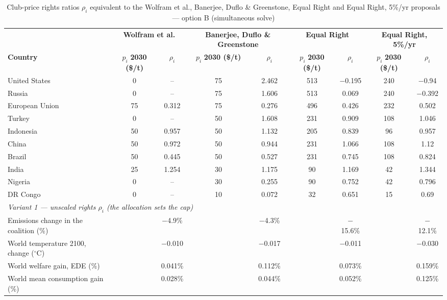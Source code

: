 \begin{table}[htbp]
\centering
\small
\caption{Club-price rights ratios $\rho_i$ equivalent to the Wolfram et al., Banerjee, Duflo \& Greenstone, Equal Right and Equal Right, 5\%/yr proposals --- option B (simultaneous solve)}
\renewcommand{\arraystretch}{1.15}
\begin{tabular}{lcccccccc}
  \toprule
  & \multicolumn{2}{c}{\textbf{Wolfram et al.}} & \multicolumn{2}{c}{\textbf{Banerjee, Duflo \& Greenstone}} & \multicolumn{2}{c}{\textbf{Equal Right}} & \multicolumn{2}{c}{\textbf{Equal Right, 5\%/yr}} \\
  \cmidrule(lr){2-3} \cmidrule(lr){4-5} \cmidrule(lr){6-7} \cmidrule(lr){8-9}
  \textbf{Country} & $p_i$ \textbf{2030 (\$/t)} & $\rho_i$ & $p_i$ \textbf{2030 (\$/t)} & $\rho_i$ & $p_i$ \textbf{2030 (\$/t)} & $\rho_i$ & $p_i$ \textbf{2030 (\$/t)} & $\rho_i$ \\
  \midrule
  United States & 0 & -- & 75 & 2.462 & 513 & $-$0.195 & 240 & $-$0.94 \\
  Russia & 0 & -- & 75 & 1.606 & 513 & 0.069 & 240 & $-$0.392 \\
  European Union & 75 & 0.312 & 75 & 0.276 & 496 & 0.426 & 232 & 0.502 \\
  Turkey & 0 & -- & 50 & 1.608 & 231 & 0.909 & 108 & 1.046 \\
  Indonesia & 50 & 0.957 & 50 & 1.132 & 205 & 0.839 & 96 & 0.957 \\
  China & 50 & 0.972 & 50 & 0.944 & 231 & 1.066 & 108 & 1.12 \\
  Brazil & 50 & 0.445 & 50 & 0.527 & 231 & 0.745 & 108 & 0.824 \\
  India & 25 & 1.254 & 30 & 1.175 & 90 & 1.169 & 42 & 1.344 \\
  Nigeria & 0 & -- & 30 & 0.255 & 90 & 0.752 & 42 & 0.796 \\
  DR Congo & 0 & -- & 10 & 0.072 & 32 & 0.651 & 15 & 0.69 \\
  \midrule
  \multicolumn{9}{l}{\textit{Variant 1 --- unscaled rights $\rho_i$ (the allocation sets the cap)}} \\
  \quad Emissions change in the coalition (\%) &  & $-$4.9\% &  & $-$4.3\% &  & $-$15.6\% &  & $-$12.1\% \\
  \quad World temperature 2100, change ($^\circ$C) &  & $-$0.010 &  & $-$0.017 &  & $-$0.011 &  & $-$0.030 \\
  \quad World welfare gain, EDE (\%) &  & 0.041\% &  & 0.112\% &  & 0.073\% &  & 0.159\% \\
  \quad World mean consumption gain (\%) &  & 0.028\% &  & 0.044\% &  & 0.052\% &  & 0.125\% \\

\end{tabular}
\end{table}
